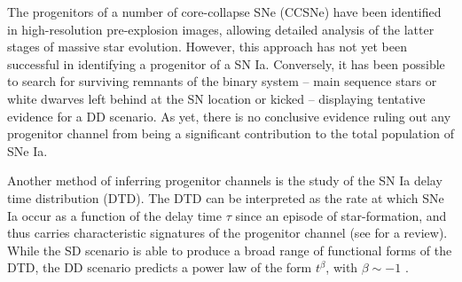 \documentclass[fleqn,usenatbib]{mnras}
\begin{document}
The progenitors of a number of core-collapse SNe (CCSNe) have been identified in high-resolution pre-explosion images, allowing detailed analysis of the latter stages of massive star evolution. However, this approach has not yet been successful in identifying a progenitor of a SN Ia. Conversely, it has been possible to search for surviving remnants of the binary system -- main sequence stars or white dwarves left behind at the SN location or kicked \citep{Shen2018} -- displaying tentative evidence for a DD scenario. As yet, there is no conclusive evidence ruling out any progenitor channel from being a significant contribution to the total population of SNe Ia.

Another method of inferring progenitor channels is the study of the SN Ia delay time distribution (DTD). The DTD can be interpreted as the rate at which SNe Ia occur as a function of the delay time $\tau$ since an episode of star-formation, and thus carries characteristic signatures of the progenitor channel (see \citealt{Wang2012} for a review). While the SD scenario is able to produce a broad range of functional forms of the DTD, the DD scenario predicts a power law of the form $t^{\beta}$, with $\beta \sim -1$ \citep[e.g][]{Ruiter2009,Mennekens2010}.
\end{document}
